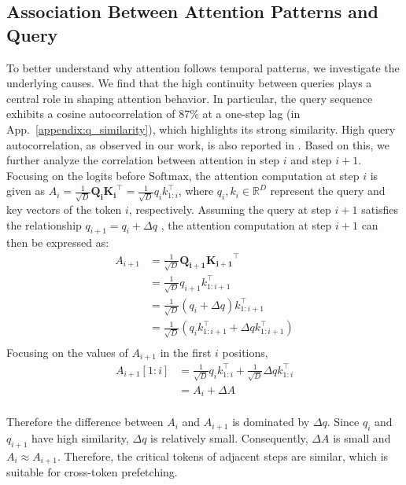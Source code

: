 \subsection{Association Between Attention Patterns and Query}
To better understand why attention follows temporal patterns, we investigate the underlying causes. We find that the high continuity between queries plays a central role in shaping attention behavior. In particular, the query sequence exhibits a cosine autocorrelation of 87\% at a one-step lag (in App.~\ref{appendix:q_similarity}), which highlights its strong similarity. High query autocorrelation, as observed in our work, is also reported in \citet{lee2024infinigen}.
Based on this, we further analyze the correlation between attention in step $i$ and step $i+1$.
Focusing on the logits before $\text{Softmax}$, the attention computation at step $i$ is given as $A_i = \frac{1}{\sqrt{D}} \mathbf{Q_i} \mathbf{K_i}^\top = \frac{1}{\sqrt{D}} q_i k_{1:i}^\top$,
where $q_i, k_i \in \mathbb{R}^{D} $ represent the query and key vectors of the token $i$, respectively.
Assuming the query at step $i+1$ satisfies the relationship 
$q_{i+1} = q_i + \Delta q$ ,
the attention computation at step $i+1$ can then be expressed as:\vspace{-5pt}
\begin{equation}
\begin{aligned}
A_{i+1} &= \frac{1}{\sqrt{D}} \mathbf{Q_{i+1}} \mathbf{K_{i+1}}^\top  \\
&= \frac{1}{\sqrt{D}} q_{i+1} k_{1:i+1}^\top   \\
&=\frac{1}{\sqrt{D}} (q_{i}+\Delta q) k_{1:i+1}^\top   \\
&=\frac{1}{\sqrt{D}} (q_{i} k_{1:i+1}^\top + \Delta q k_{1:i+1}^\top) \\
\end{aligned}
\end{equation}
Focusing on the values of $A_{i+1}$ in the first $i$ positions,
\begin{equation}
\begin{aligned}
A_{i+1}[1:i] &=\frac{1}{\sqrt{D}} q_{i} k_{1:i}^\top + \frac{1}{\sqrt{D}}\Delta q k_{1:i}^\top \\
&= A_i + \Delta A \\
\end{aligned}
\end{equation}

Therefore the difference between $A_i$ and $A_{i+1}$ is dominated by $\Delta q$. Since $q_i$ and $q_{i+1}$ have high similarity, $\Delta q$ is relatively small. Consequently, $\Delta A$ is small and $A_i \approx A_{i+1}$. Therefore, the critical tokens of adjacent steps are similar, which is suitable for cross-token prefetching.



